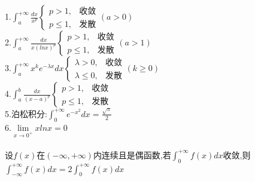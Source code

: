\documentclass{article}
\begin{document}
\begin{flushleft}
	1.$\int_{a}^{+\infty}\frac{dx}{x^p}\left\{
	\begin{array}{lcl}
	p>1, & \mbox{收敛}\\
	p\le 1, & \mbox{发散}
	\end{array} \right.(a>0)$\\
	2.$\int_{a}^{+\infty}\frac{dx}{x(lnx)^p}\left\{
	\begin{array}{lcl}
	p>1, & \mbox{收敛}\\
	p\le 1, & \mbox{发散}
	\end{array} \right.(a>1)$\\
	3.$\int_{a}^{+\infty}x^ke^{-\lambda x}dx\left\{
	\begin{array}{lcl}
	\lambda>0, & \mbox{收敛}\\
	\lambda\le 0, & \mbox{发散}
	\end{array} \right.(k\ge 0)$\\
	4.$\int_{a}^{b}\frac{dx}{(x-a)^p}\left\{
	\begin{array}{lcl}
	p>1, & \mbox{收敛}\\
	p\le 1, & \mbox{发散}
	\end{array} \right.$\\
	5.泊松积分:$\int_{0}^{+\infty}e^{-x^2}dx=\frac{\sqrt{\pi}}{2}$\\
	6.$\lim\limits_{x\to 0^+}xlnx=0$\\
	~\\
	设$f(x)$在$(-\infty,+\infty)$内连续且是偶函数,若$\int_{0}^{+\infty}f(x)dx$收敛,则$\int_{-\infty}^{+\infty}f(x)dx=2\int_{0}^{+\infty}f(x)dx$\\
	
\end{flushleft}
\end{document}
